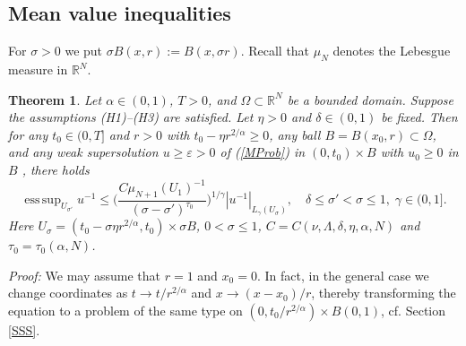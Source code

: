 \documentclass[10pt]{article}
\newtheorem{satz}{Theorem}[section]
\newcommand{\iR}{\mathbb{R}}
\DeclareMathOperator*{\esup}{ess\,sup}
\begin{document}
\subsection{Mean value inequalities}
For $\sigma>0$ we put $\sigma B(x,r):=B(x,\sigma r)$. Recall that
$\mu_N$ denotes the Lebesgue measure in $\iR^N$.
\begin{satz} \label{superest1}
Let $\alpha\in(0,1)$, $T>0$, and $\Omega\subset \iR^N$ be a bounded
domain. Suppose the assumptions (H1)--(H3) are satisfied. Let
$\eta>0$ and $\delta\in (0,1)$ be fixed. Then for any $t_0\in(0,T]$
and $r>0$ with $t_0-\eta r^{2/\alpha}\ge 0$, any ball
$B=B(x_0,r)\subset\Omega$, and any weak supersolution $u\ge
\varepsilon>0$ of (\ref{MProb}) in $(0,t_0)\times B$ with $u_0\ge 0$
in $B$ , there holds
\[
\esup_{U_{\sigma'}}{u^{-1}} \le \Big(\frac{C \mu_{N+1}(U_1)^{-1}
}{(\sigma-\sigma')^{\tau_0}}\Big)^{1/\gamma}
|u^{-1}|_{L_{\gamma}(U_\sigma)},\quad \delta\le \sigma'<\sigma\le
1,\; \gamma\in (0,1].
\]
Here $U_\sigma=(t_0-\sigma\eta r^{2/\alpha},t_0)\times \sigma B$,
$0<\sigma\le 1$, $C=C(\nu,\Lambda,\delta,\eta,\alpha,N)$ and
$\tau_0=\tau_0(\alpha,N)$.
\end{satz}
{\em Proof:} We may assume that $r=1$ and $x_0=0$. In fact, in the
general case we change coordinates as $t\rightarrow
t/r^{2/\alpha}$ and $x\rightarrow (x-x_0)/r$, thereby transforming
the equation to a problem of the same type on
$(0,t_0/r^{2/\alpha})\times B(0,1)$, cf. Section \ref{SSS}.
\end{document}
